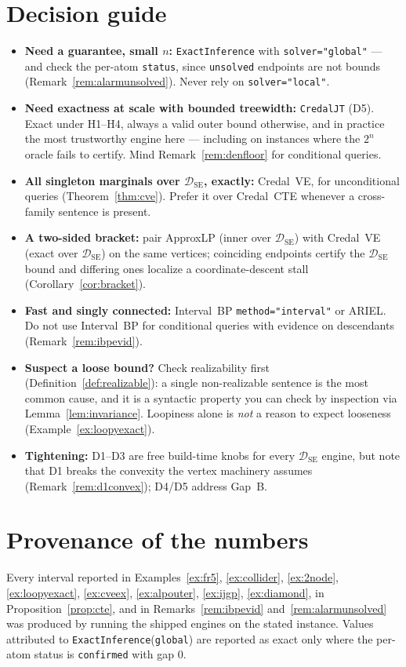 \documentclass[11pt]{article}
\theoremstyle{definition}
\newcommand{\DSE}{\mathcal{D}_{\mathrm{SE}}}
\begin{document}
\section{Decision guide}\label{sec:guide}

\begin{itemize}
  \item \textbf{Need a guarantee, small $n$:} \texttt{ExactInference} with \texttt{solver="global"}
    --- and check the per-atom \texttt{status}, since \texttt{unsolved} endpoints are not bounds
    (Remark~\ref{rem:alarmunsolved}). Never rely on \texttt{solver="local"}.
  \item \textbf{Need exactness at scale with bounded treewidth:} \texttt{CredalJT} (D5). Exact under
    H1--H4, always a valid outer bound otherwise, and in practice the most trustworthy engine here ---
    including on instances where the $2^n$ oracle fails to certify. Mind
    Remark~\ref{rem:denfloor} for conditional queries.
  \item \textbf{All singleton marginals over $\DSE$, exactly:} Credal~VE, for unconditional queries
    (Theorem~\ref{thm:cve}). Prefer it over Credal~CTE whenever a cross-family sentence is present.
  \item \textbf{A two-sided bracket:} pair ApproxLP (inner over $\DSE$) with Credal~VE (exact over
    $\DSE$) on the same vertices; coinciding endpoints certify the $\DSE$ bound and differing ones
    localize a coordinate-descent stall (Corollary~\ref{cor:bracket}).
  \item \textbf{Fast and singly connected:} Interval~BP \texttt{method="interval"} or ARIEL. Do not use
    Interval~BP for conditional queries with evidence on descendants
    (Remark~\ref{rem:ibpevid}).
  \item \textbf{Suspect a loose bound?} Check realizability first (Definition~\ref{def:realizable}):
    a single non-realizable sentence is the most common cause, and it is a syntactic property you can
    check by inspection via Lemma~\ref{lem:invariance}. Loopiness alone is \emph{not} a reason to
    expect looseness (Example~\ref{ex:loopyexact}).
  \item \textbf{Tightening:} D1--D3 are free build-time knobs for every $\DSE$ engine, but note that D1
    breaks the convexity the vertex machinery assumes (Remark~\ref{rem:d1convex}); D4/D5 address
    Gap~B.
\end{itemize}

\section*{Provenance of the numbers}
Every interval reported in Examples~\ref{ex:fr5}, \ref{ex:collider}, \ref{ex:2node},
\ref{ex:loopyexact}, \ref{ex:cveex}, \ref{ex:alpouter}, \ref{ex:ijgp}, \ref{ex:diamond}, in
Proposition~\ref{prop:cte}, and in Remarks~\ref{rem:ibpevid} and~\ref{rem:alarmunsolved} was
produced by running the shipped engines on the stated instance. Values attributed to
\texttt{ExactInference}(\texttt{global}) are reported as exact only where the per-atom status is
\texttt{confirmed} with gap $0$.
\end{document}
